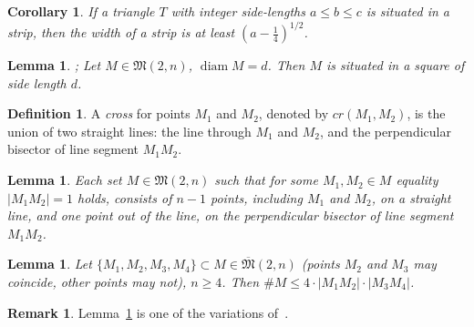 \documentclass[a4paper,14pt]{article} %
\theoremstyle{plain}
\newtheorem{lemma}[theorem]{Lemma}
\newtheorem{corollary}[theorem]{Corollary}
\theoremstyle{definition}
\newtheorem{definition}[theorem]{Definition}
\newtheorem{remark}[theorem]{Remark}
\begin{document}
\begin{corollary}
	\label{cor:solymosi_strip}
	If a triangle $T$ with integer side-lengths $a \leq b \leq c$ is situated in a strip,
	then the width of a strip is at least $\left(a - \frac{1}{4}\right)^{1/2}$.
\end{corollary}


\begin{lemma}
	\cite[Lemma 4]{our-vmmsh-2018};
	\cite[Lemma 2.4]{my-pps-linear-bound-2019}
	\label{lem:square_container}
	Let $M\in\mathfrak{M}(2,n)$, $\operatorname{diam} M = d$.
	Then $M$ is situated in a square of side length $d$.
\end{lemma}

\begin{definition}
	\cite[Definition 2.5]{my-pps-linear-bound-2019}
	A \textit{cross} for points $M_1$ and $M_2$, denoted by $cr(M_1,M_2)$, is the union of two straight lines:
	the line through $M_1$ and $M_2$,
	and the perpendicular bisector of line segment $M_1 M_2$.
\end{definition}

\begin{lemma}
	\cite[Theorem 3.10]{my-pps-linear-bound-2019}
	\label{lem:no_distance_one}
	Each set $M\in\mathfrak{M}(2,n)$
	such that for some $M_1,M_2 \in M$ equality $|M_1 M_2|=1$ holds,
	consists of $n-1$ points, including $M_1$ and $M_2$, on a straight line,
	and one point out of the line, on the perpendicular bisector of line segment $M_1 M_2$.
\end{lemma}


\begin{lemma}
	\label{lem:count_of_points_on_hyperbolas}
	Let $\{M_1, M_2, M_3, M_4\} \subset M\in\overline{\mathfrak{M}}(2,n)$
	(points $M_2$ and $M_3$ may coincide, other points may not), $n\geq 4$.
	Then $\# M \leq 4 \cdot |M_1 M_2| \cdot |M_3 M_4|$.
\end{lemma}

\begin{remark}
	Lemma~\ref{lem:count_of_points_on_hyperbolas} is one of the variations of~\cite{erdos1945integral}.
\end{remark}
\end{document}
